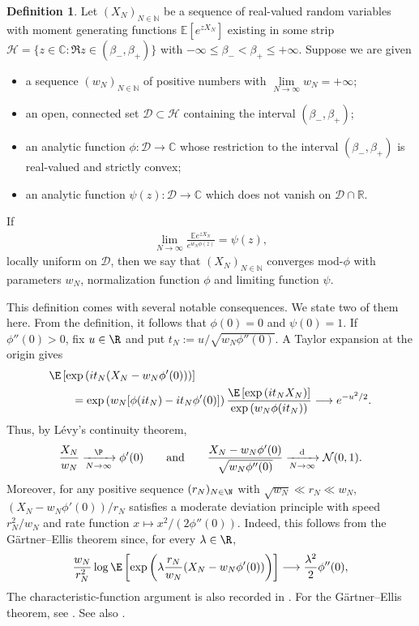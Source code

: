 \documentclass[11pt,a4paper]{scrartcl}
\numberwithin{equation}{section}
\theoremstyle{plain}
\theoremstyle{definition}
\newtheorem{definition}{Definition}[section]
\theoremstyle{remark}
\begin{document}
\begin{definition}\label{def: mod_phi_convergence}
	Let $(X_N)_{N\in\mathbb{N}}$ be a sequence of real-valued random variables with moment generating functions $\mathbb{E}[e^{zX_N}]$ existing in some strip
	$\mathscr{H} = \{z \in \mathbb{C} : \Re z \in (\beta_-, \beta_+)\}$ with $-\infty \leq \beta_- < \beta_+ \leq +\infty$. Suppose we are given
	\begin{itemize}
	\item[(i)] a sequence $(w_N)_{N\in\mathbb{N}}$ of positive numbers with $\lim\limits_{N\to\infty} w_N = +\infty$;
	\item[(ii)] an open, connected set $\mathscr{D} \subset \mathscr{H}$ containing the interval $(\beta_-, \beta_+)$;
	\item[(iii)] an analytic function $\phi : \mathscr{D} \to \mathbb{C}$ whose restriction to the interval $(\beta_-, \beta_+)$ is real-valued and strictly convex;
	\item[(iv)] an analytic function $\psi(z) : \mathscr{D} \to \mathbb{C}$ which does not vanish on $\mathscr{D} \cap \mathbb{R}$.
	\end{itemize}
	If
	\begin{align*}
		\lim_{N\to\infty} \frac{\mathbb{E}e^{zX_N}}{e^{w_N \phi(z)}} = \psi(z),
	\end{align*}
	locally uniform on $\mathscr{D}$, then we say that $(X_N)_{N\in\mathbb{N}}$ converges mod-$\phi$ with parameters $w_N$, normalization function $\phi$ and limiting function $\psi$.
\end{definition}

This definition comes with several notable consequences. We state two of them here. From the definition, it follows that 
$\phi(0)=0$ and $\psi(0)=1$. If $\phi''(0)>0$, fix $u\in\R$ and put
$t_N:=u/\sqrt{w_N\phi''(0)}$. A Taylor expansion at the origin gives
\begin{align*}
 &\E\left[\exp\left(it_N(X_N-w_N\phi'(0))\right)\right] \\
 &\qquad=\exp\left(w_N[\phi(it_N)-it_N\phi'(0)]\right)\frac{\E\left[\exp\left(it_N X_N\right)\right]}{\exp\left(w_N\phi(it_N)\right)}
 \longrightarrow e^{-u^2/2}.
\end{align*}
Thus, by L\'evy's continuity theorem,
\[
 \frac{X_N}{w_N}\xrightarrow[N\to\infty]{\P}\phi'(0)
 \qquad\text{and}\qquad
 \frac{X_N-w_N\phi'(0)}{\sqrt{w_N\phi''(0)}}
 \xrightarrow[N\to\infty]{\mathrm d}\mathcal{N}(0,1).
\]
Moreover, for any positive sequence $(r_N)_{N\in\N}$ with
$\sqrt{w_N}\ll r_N\ll w_N$, $(X_N-w_N\phi'(0))/r_N$ satisfies a moderate deviation principle with
speed $r_N^2/w_N$ and rate function $x\mapsto x^2/(2\phi''(0))$. Indeed, this
follows from the G\"artner--Ellis theorem since, for every $\lambda\in\R$,
\[
 \frac{w_N}{r_N^2}\log\E\left[
 \exp\left(\lambda\frac{r_N}{w_N}
 (X_N-w_N\phi'(0))\right)\right]
 \longrightarrow \frac{\lambda^2}{2}\phi''(0),
\]
The characteristic-function argument is also recorded in
\cite[Remark~3.10]{feray2018mod}. For the G\"artner--Ellis theorem, see
\cite[Theorem~2.3.6]{DemboZeitouni}. See also
\cite[Chapter~9.2]{KabluchkoSteigenbergerThaele}.
\end{document}
